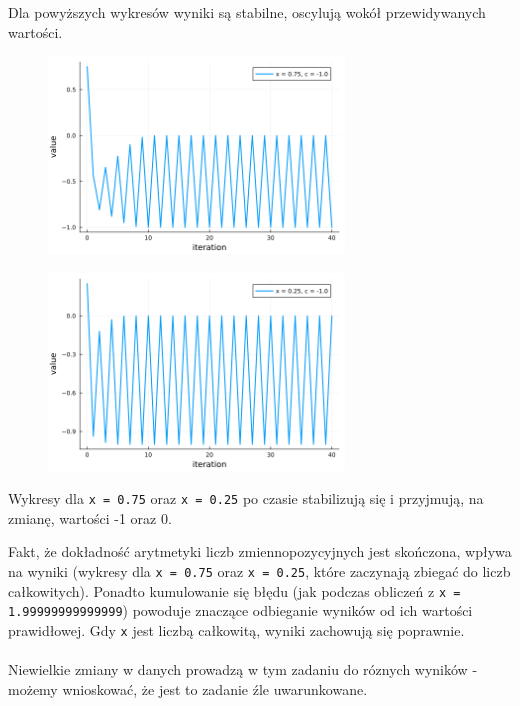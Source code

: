 \documentclass[15pt, a4paper]{article}
\begin{document}
\vspace{0.5cm}

\noindent Dla powyższych wykresów wyniki są stabilne, oscylują wokół przewidywanych wartości.

\vspace{0.5cm}

\pagebreak

\begin{figure}[h]
    \centering
    \includegraphics[width=0.7\textwidth]{img/6_6_plot.png}
\end{figure}

\begin{figure}[h]
    \centering
    \includegraphics[width=0.7\textwidth]{img/6_7_plot.png}
\end{figure}

\vspace{0.5cm}

\noindent Wykresy dla \verb|x = 0.75| oraz \verb|x = 0.25| po czasie stabilizują się i przyjmują, na zmianę, wartości -1 oraz 0.

\vspace{0.5cm}

\noindent Fakt, że dokładność arytmetyki liczb zmiennopozycyjnych jest skończona, wpływa na wyniki (wykresy dla \verb|x = 0.75| oraz \verb|x = 0.25|, które zaczynają zbiegać do liczb całkowitych).  Ponadto kumulowanie się błędu (jak podczas obliczeń z \verb|x = 1.99999999999999|) powoduje znaczące odbieganie wyników od ich wartości prawidłowej. Gdy \verb|x| jest liczbą całkowitą, wyniki zachowują się poprawnie.\\\\
Niewielkie zmiany w danych prowadzą w tym zadaniu do róznych wyników - możemy wnioskować, że jest to zadanie źle uwarunkowane.
\end{document}
